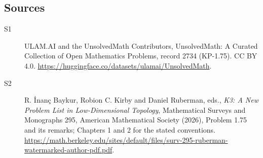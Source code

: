 \documentclass[11pt]{article}
\begin{document}
\subsection{Sources}
\begin{description}
\item[\hypertarget{source:2734:1}{S1}] ULAM.AI and the UnsolvedMath Contributors, UnsolvedMath: A Curated Collection of Open Mathematics Problems, record 2734 (KP-1.75). CC BY 4.0. \url{https://huggingface.co/datasets/ulamai/UnsolvedMath}.
\item[\hypertarget{source:2734:2}{S2}] R. İnanç Baykur, Robion C. Kirby and Daniel Ruberman, eds., \emph{K3: A New Problem List in Low-Dimensional Topology}, Mathematical Surveys and Monographs 295, American Mathematical Society (2026), Problem 1.75 and its remarks; Chapters 1 and 2 for the stated conventions. \url{https://math.berkeley.edu/sites/default/files/surv-295-ruberman-watermarked-author-pdf.pdf}.
\end{description}
\label{end:2734}
\end{document}
